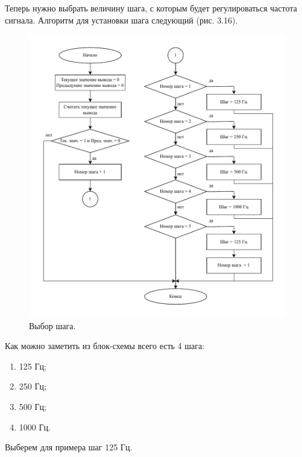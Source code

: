 	Теперь нужно выбрать величину шага, с которым будет регулироваться частота сигнала. Алгоритм для установки шага следующий (рис. 3.16).
	
	\begin{figure}[H]
    \centering
    \includegraphics[width=1\textwidth]{../image/step_select.pdf}
    \caption{Выбор шага.}
	\end{figure}	
	
	Как можно заметить из блок-схемы всего есть 4 шага:
	\begin{enumerate}
		\item 125 Гц;
		\item 250 Гц;
		\item 500 Гц;
		\item 1000 Гц.
	\end{enumerate}
	
	Выберем для примера шаг 125 Гц.
	
